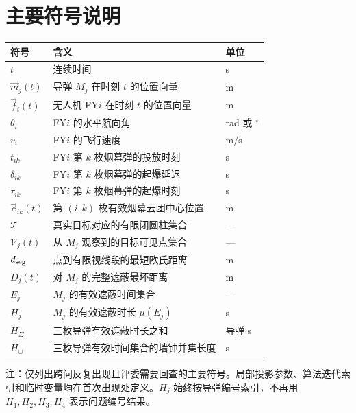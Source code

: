 \section{主要符号说明}
\begingroup
\normalsize
\renewcommand{\arraystretch}{1.22}
\setlength{\tabcolsep}{6pt}
\begin{center}
\begin{tabularx}{\textwidth}{>{\centering\arraybackslash}p{} X >{\centering\arraybackslash}p{}}
\toprule
\textbf{符号} & \textbf{含义} & \textbf{单位} \\
\midrule
$t$ & 连续时间 & s \\
$\vec m_j(t)$ & 导弹 $M_j$ 在时刻 $t$ 的位置向量 & m \\
$\vec f_i(t)$ & 无人机 FY$i$ 在时刻 $t$ 的位置向量 & m \\
$\theta_i$ & FY$i$ 的水平航向角 & rad 或 $^\circ$ \\
$v_i$ & FY$i$ 的飞行速度 & m/s \\
$t_{ik}$ & FY$i$ 第 $k$ 枚烟幕弹的投放时刻 & s \\
$\delta_{ik}$ & FY$i$ 第 $k$ 枚烟幕弹的起爆延迟 & s \\
$\tau_{ik}$ & FY$i$ 第 $k$ 枚烟幕弹的起爆时刻 & s \\
$\vec c_{ik}(t)$ & 第 $(i,k)$ 枚有效烟幕云团中心位置 & m \\
$\mathcal T$ & 真实目标对应的有限闭圆柱集合 & --- \\
$\mathcal V_j(t)$ & 从 $M_j$ 观察到的目标可见点集合 & --- \\
$d_{\rm seg}$ & 点到有限视线段的最短欧氏距离 & m \\
$D_j(t)$ & 对 $M_j$ 的完整遮蔽最坏距离 & m \\
$E_j$ & $M_j$ 的有效遮蔽时间集合 & --- \\
$H_j$ & $M_j$ 的有效遮蔽时长 $\mu(E_j)$ & s \\
$H_\Sigma$ & 三枚导弹有效遮蔽时长之和 & 导弹$\cdot$s \\
$H_\cup$ & 三枚导弹有效时间集合的墙钟并集长度 & s \\
\bottomrule
\end{tabularx}
\vspace{0.12em}
\begin{minipage}{\textwidth}
{\small\color{cumcmgray}\raggedright 注：仅列出跨问反复出现且评委需要回查的主要符号。局部投影参数、算法迭代索引和临时变量均在首次出现处定义。$H_j$ 始终按导弹编号索引，不再用 $H_1,H_2,H_3,H_4$ 表示问题编号结果。\par}
\end{minipage}
\end{center}
\endgroup
